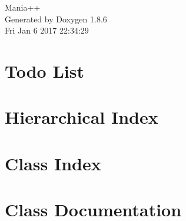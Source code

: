\documentclass[twoside]{book}
\newcommand{\clearemptydoublepage}{%
  \newpage{\pagestyle{empty}\cleardoublepage}%
}
\begin{document}
\hypersetup{pageanchor=false}
\begin{titlepage}
\vspace*{7cm}
\begin{center}%
{\Large Mania++ }\\
\vspace*{1cm}
{\large Generated by Doxygen 1.8.6}\\
\vspace*{0.5cm}
{\small Fri Jan 6 2017 22:34:29}\\
\end{center}
\end{titlepage}
\clearemptydoublepage
\tableofcontents
\clearemptydoublepage
{}
\hypersetup{pageanchor=true}

\chapter{Todo List}
\label{todo}
\hypertarget{todo}{}

\chapter{Hierarchical Index}

\chapter{Class Index}

\chapter{Class Documentation}





















































\newpage
{}
{}
\printindex
\end{document}
